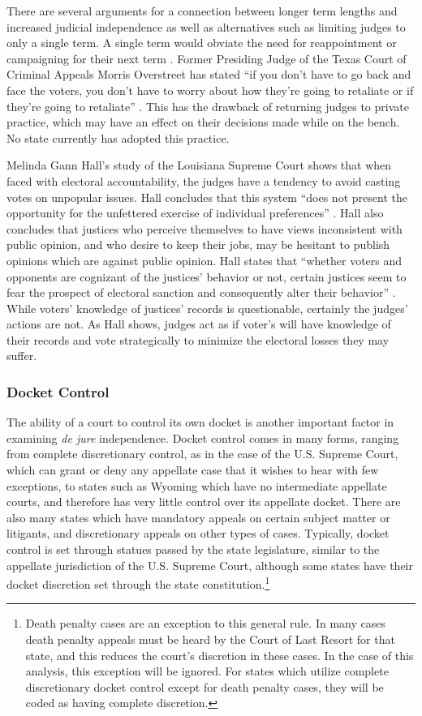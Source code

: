 \documentclass[12pt]{article}
\begin{document}
There are several arguments for a connection between longer term lengths and increased judicial independence as well as alternatives such as limiting judges to only a single term. A single term would obviate the need for reappointment or campaigning for their next term \citep{Carrington1998}.  Former Presiding Judge of the Texas Court of Criminal Appeals Morris Overstreet has stated ``if you don't have to go back and face the voters, you don't have to worry about how they're going to retaliate or if they're going to retaliate'' \citep{ABA2003}.  This has the drawback of returning judges to private practice, which may have an effect on their decisions made while on the bench.  No state currently has adopted this practice.

Melinda Gann Hall's \citeyearpar{Hall1987} study of the Louisiana Supreme Court shows that when faced with electoral accountability, the judges have a tendency to avoid casting votes on unpopular issues. Hall concludes that this system ``does not present the opportunity for the unfettered exercise of individual preferences'' \citep[46]{Hall1987}.  Hall also concludes that justices who perceive themselves to have views inconsistent with public opinion,  and who desire to keep their jobs, may be hesitant to publish opinions which are against public opinion. Hall states that ``whether voters and opponents are cognizant of the justices’ behavior or not, certain justices seem to fear the prospect of electoral sanction and consequently alter their behavior'' \citep{Hall1987}.  While voters’ knowledge of justices' records is questionable, certainly the judges' actions are not.  As Hall shows, judges act as if voter's will have knowledge of their records and vote strategically to minimize the electoral losses they may suffer.

\subsubsection*{Docket Control}
The ability of a court to control its own docket is another important factor in examining \textit{de jure} independence.  Docket control comes in many forms, ranging from complete discretionary control, as in the case of the U.S. Supreme Court, which can grant or deny any appellate case that it wishes to hear with few exceptions, to states such as Wyoming which have no intermediate appellate courts, and therefore has very little control over its appellate docket. There are also many states which have mandatory appeals on certain subject matter or litigants, and discretionary appeals on other types of cases.  Typically, docket control is set through statues passed by the state legislature, similar to the appellate jurisdiction of the U.S. Supreme Court, although some states have their docket discretion set through the state constitution.\footnote{Death penalty cases are an exception to this general rule.  In many cases death penalty appeals must be heard by the Court of Last Resort for that state, and this reduces the court's discretion in these cases.  In the case of this analysis, this exception will be ignored.  For states which utilize complete discretionary docket control except for death penalty cases, they will be coded as having complete discretion.}
\end{document}
